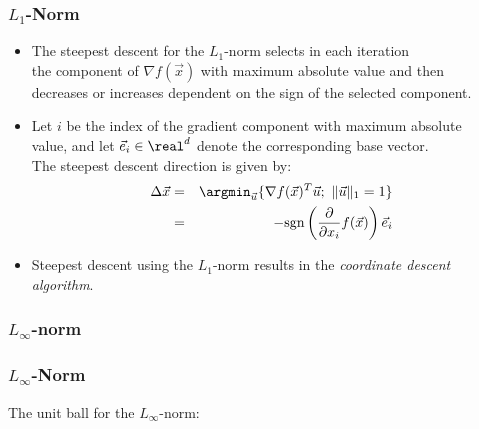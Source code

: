 \begin{frame}
  \frametitle{$L_1$-Norm \cont}

  \begin{itemize}
    \item The steepest descent for the $L_1$-norm selects in each iteration \\
      the component of $\nabla f(\vec x)$ with maximum absolute value and then \\
      decreases or increases dependent on the sign of the selected component. \pause
    \item Let $i$ be the index of the gradient component with maximum absolute \\
      value, and let $\vec e_i\in\real^d$ denote the corresponding base vector.\\
      The steepest descent direction is given by:
      \begin{eqnarray*}
        \Delta \vec x &=& \argmin_{\vec u} \{\nabla f(\vec x)^T \vec u ; \ \| \vec u\|_1 = 1\} \\
                      &=& -\mbox{sgn}\left(\frac{\partial}{\partial x_i} f(\vec x)\right)\vec e_i
      \end{eqnarray*}
      \pause
    \item {} Steepest descent using the $L_1$-norm results in the {\em coordinate descent algorithm}.
  \end{itemize}
\end{frame}


\subsubsection{$L_\infty$-norm}

\begin{frame}
  \frametitle{$L_\infty$-Norm}

  The unit ball for the $L_\infty$-norm: \\[.25cm]

  \begin{columns}
  
      \centering
    
        \centering
        \resizebox{.9\linewidth}{!}{
          
        }
  \end{columns}
\end{frame}


